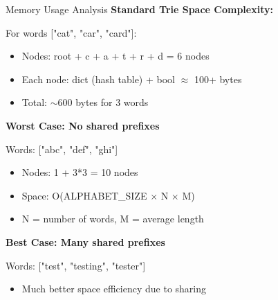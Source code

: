 \documentclass[aspectratio=169]{beamer}
\begin{document}
\begin{frame}{Memory Usage Analysis}
  \textbf{Standard Trie Space Complexity:}

  \vspace{0.3cm}
  For words ["cat", "car", "card"]:
  \begin{itemize}
    \item Nodes: root + c + a + t + r + d = 6 nodes
    \item Each node: dict (hash table) + bool $\approx$ 100+ bytes
    \item Total: $\sim$600 bytes for 3 words
  \end{itemize}

  \vspace{0.3cm}
  \textbf{Worst Case: No shared prefixes}

  Words: ["abc", "def", "ghi"]
  \begin{itemize}
    \item Nodes: 1 + 3*3 = 10 nodes
    \item Space: O(ALPHABET\_SIZE $\times$ N $\times$ M)
    \item N = number of words, M = average length
  \end{itemize}

  \vspace{0.3cm}
  \textbf{Best Case: Many shared prefixes}

  Words: ["test", "testing", "tester"]
  \begin{itemize}
    \item Much better space efficiency due to sharing
  \end{itemize}
\end{frame}
\end{document}
